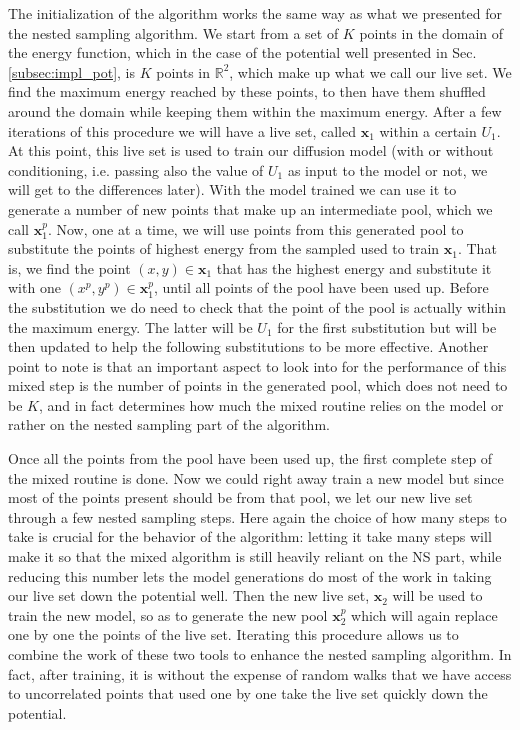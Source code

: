 \documentclass[a4paper, 12pt]{article}          %
\begin{document}
The initialization of the algorithm works the same way as what we presented for the nested sampling algorithm. We start from a set of $K$ points in the domain of the energy function, which in the case of the potential well presented in Sec. \ref{subsec:impl_pot}, is $K$ points in $\mathbb{R}^2$, which make up what we call our live set. We find the maximum energy reached by these points, to then have them shuffled around the domain while keeping them within the maximum energy. After a few iterations of this procedure we will have a live set, called $\mathbf{x}_1$ within a certain $U_1$. At this point, this live set is used to train our diffusion model (with or without conditioning, i.e. passing also the value of $U_1$ as input to the model or not, we will get to the differences later). With the model trained we can use it to generate a number of new points that make up an intermediate pool, which we call $\mathbf{x}_1^p$. Now, one at a time, we will use points from this generated pool to substitute the points of highest energy from the sampled used to train $\mathbf{x}_1$. That is, we find the point $(x,y)\in\mathbf{x}_1$ that has the highest energy and substitute it with one $(x^p,y^p)\in\mathbf{x}_1^p$, until all points of the pool have been used up. Before the substitution we do need to check that the point of the pool is actually within the maximum energy. The latter will be $U_1$ for the first substitution but will be then updated to help the following substitutions to be more effective. Another point to note is that an important aspect to look into for the performance of this mixed step is the number of points in the generated pool, which does not need to be $K$, and in fact determines how much the mixed routine relies on the model or rather on the nested sampling part of the algorithm. 

Once all the points from the pool have been used up, the first complete step of the mixed routine is done. Now we could right away train a new model but since most of the points present should be from that pool, we let our new live set through a few nested sampling steps. Here again the choice of how many steps to take is crucial for the behavior of the algorithm: letting it take many steps will make it so that the mixed algorithm is still heavily reliant on the NS part, while reducing this number lets the model generations do most of the work in taking our live set down the potential well. Then the new live set, $\mathbf{x}_2$ will be used to train the new model, so as to generate the new pool $\mathbf{x}_2^p$ which will again replace one by one the points of the live set. Iterating this procedure allows us to combine the work of these two tools to enhance the nested sampling algorithm. In fact, after training, it is without the expense of random walks that we have access to uncorrelated points that used one by one take the live set quickly down the potential. 
\end{document}

